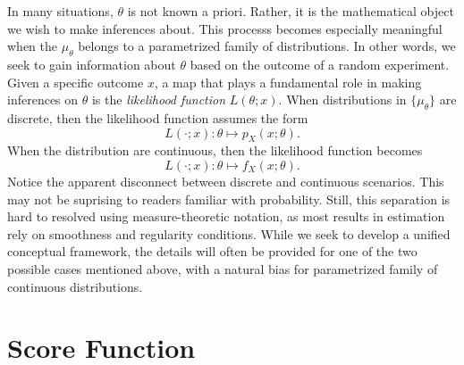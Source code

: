 In many situations, $\theta$ is not known a priori.
Rather, it is the mathematical object we wish to make inferences about.
This processs becomes especially meaningful when the $\mu_{\theta}$ belongs to a parametrized family of distributions.
In other words, we seek to gain information about $\theta$ based on the outcome of a random experiment.
Given a specific outcome $x$, a map that plays a fundamental role in making inferences on $\theta$ is the \emph{likelihood function} $L(\theta; x)$.
When distributions in $\{ \mu_{\theta} \}$ are discrete, then the likelihood function assumes the form
\begin{equation*}
L(\cdot ; x) : \theta \mapsto p_X(x ; \theta) .
\end{equation*}
When the distribution are continuous, then the likelihood function becomes
\begin{equation*}
L(\cdot ; x) : \theta \mapsto f_X(x ; \theta) .
\end{equation*}
Notice the apparent disconnect between discrete and continuous scenarios.
This may not be suprising to readers familiar with probability.
Still, this separation is hard to resolved using measure-theoretic notation, as most results in estimation rely on smoothness and regularity conditions.
While we seek to develop a unified conceptual framework, the details will often be provided for one of the two possible cases mentioned above, with a natural bias for parametrized family of continuous distributions.


\section{Score Function}

